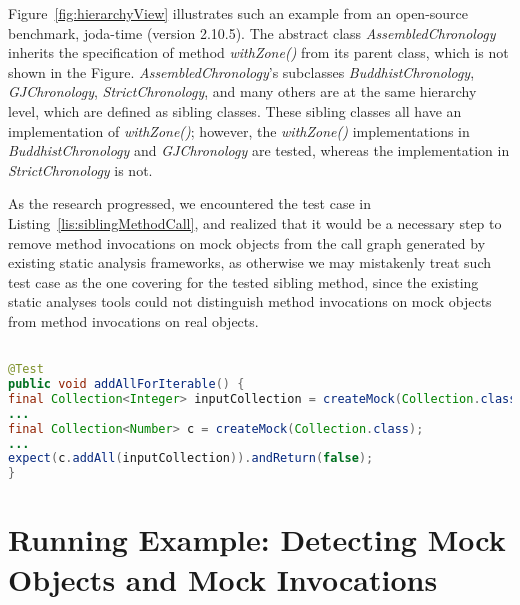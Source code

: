Figure~\ref{fig:hierarchyView} illustrates such an example from an open-source benchmark, joda-time (version 2.10.5). The abstract class \textit{AssembledChronology} inherits the specification of method \textit{withZone()} from its parent class, which is not shown in the Figure. \textit{AssembledChronology}'s subclasses \textit{BuddhistChronology}, \textit{GJChronology}, \textit{StrictChronology}, and many others are at the same hierarchy level, which are defined as sibling classes. These sibling classes all have an implementation of \textit{withZone()}; however, the \textit{withZone()} implementations in \textit{BuddhistChronology} and \textit{GJChronology} are tested, whereas the implementation in \textit{StrictChronology} is not.

As the research progressed, we encountered the test case in Listing~\ref{lis:siblingMethodCall}, and realized that it would be a necessary step to remove method invocations on mock objects from the call graph generated by existing static analysis frameworks, as otherwise we may mistakenly treat such test case as the one covering for the tested sibling method, since the existing static analyses tools could not distinguish method invocations on mock objects from method invocations on real objects. 

\begin{lstlisting}[basicstyle=\ttfamily, caption={This code snippet illustrates an example from commons-collections4, where the method \textit{addAll()} invoked on the mock object \texttt{c} could be mislabelled as a focal method.},
basicstyle=\ttfamily,language = Java, framesep=4.5mm, escapechar=|,
framexleftmargin=1.0mm, captionpos=b, label=lis:siblingMethodCall, morekeywords={@Test}]

@Test
public void addAllForIterable() {
final Collection<Integer> inputCollection = createMock(Collection.class);
...
final Collection<Number> c = createMock(Collection.class);
...
expect(c.addAll(inputCollection)).andReturn(false);
}
\end{lstlisting}

\section{Running Example: Detecting Mock Objects and Mock Invocations}
\label{sec:running-example}

